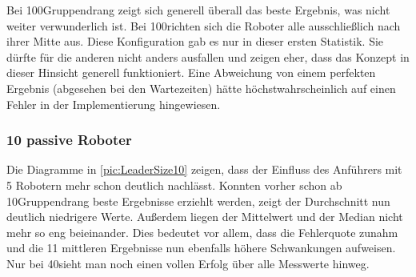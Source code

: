 Bei 100\per Gruppendrang zeigt sich generell überall das beste Ergebnis, was nicht weiter verwunderlich ist. Bei 100\per richten sich die Roboter alle ausschließlich nach ihrer Mitte aus. Diese Konfiguration gab es nur in dieser ersten Statistik. Sie dürfte für die anderen nicht anders ausfallen und zeigen eher, dass das Konzept in dieser Hinsicht generell funktioniert. Eine Abweichung von einem perfekten Ergebnis (abgesehen bei den Wartezeiten) hätte höchstwahrscheinlich auf einen Fehler in der Implementierung hingewiesen.

\subsubsection*{10 passive Roboter}

Die Diagramme in \autoref{pic:LeaderSize10} zeigen, dass der Einfluss des Anführers mit 5 Robotern mehr schon deutlich nachlässt. Konnten vorher schon ab 10\per Gruppendrang beste Ergebnisse erziehlt werden, zeigt der Durchschnitt nun deutlich niedrigere Werte. Außerdem liegen der Mittelwert und der Median nicht mehr so eng beieinander. Dies bedeutet vor allem, dass die Fehlerquote zunahm und die 11 mittleren Ergebnisse nun ebenfalls höhere Schwankungen aufweisen. Nur bei 40\per sieht man noch einen vollen Erfolg über alle Messwerte hinweg.

